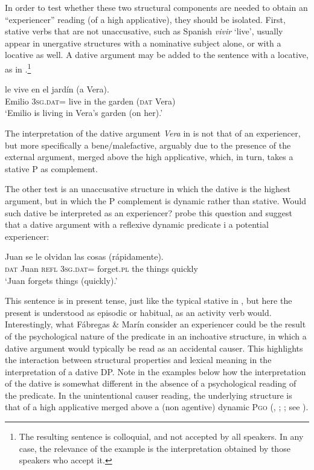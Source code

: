 \documentclass[output=paper,colorlinks,citecolor=brown,nonflat]{./langscibook}
\begin{document}
In order to test whether these two structural components are needed to obtain an “experiencer” reading (of a high applicative), they should be isolated. First, stative verbs that are not unaccusative, such as Spanish \textit{vivir} ‘live’, usually appear in unergative structures with a nominative subject alone, or with a locative as well. A dative argument may be added to the sentence with a locative, as in .\footnote{The resulting sentence is colloquial, and not accepted by all speakers. In any case, the relevance of the example is the interpretation obtained by those speakers who accept it.} 

\ea%
    \label{ex:cuervo:20}
     {le} {vive} {en} {el} {jardín} ({a} {Vera}).\\
    Emilio 3\textsc{sg.dat}= live in the garden (\textsc{dat}  Vera)\\
    \glt ‘Emilio is living in Vera’s garden (on her).’
    \z

The interpretation of the dative argument \textit{Vera} in  is not that of an experiencer, but more specifically a bene/malefactive, arguably due to the presence of the external argument, merged above the high applicative, which, in turn, takes a stative \liv P as complement. 

The other test is an unaccusative structure in which the dative is the highest argument, but in which the \liv P complement is dynamic rather than stative. Would such dative be interpreted as an experiencer?  probe this question and suggest that a dative argument with a reflexive dynamic predicate i a potential experiencer: 

\ea%
    \label{ex:cuervo:21}
     {Juan} {se} {le} {olvidan} {las} {cosas} {(rápidamente)}.\\
    \textsc{dat} Juan  \textsc{refl} 3\textsc{sg.dat}= forget.\textsc{pl} the things quickly\\
    \glt ‘Juan forgets things (quickly).'
    \z

This sentence is in present tense, just like the typical stative in , but here the present is understood as episodic or habitual, as an activity verb would. Interestingly, what Fábregas \& Marín consider an experiencer could be the result of the psychological nature of the predicate in an inchoative structure, in which a dative argument would typically be read as an accidental causer. This highlights the interaction between structural properties and lexical meaning in the interpretation of a dative DP. Note in the examples below how the interpretation of the dative is somewhat different in the absence of a psychological reading of the predicate. In the unintentional causer reading, the underlying structure is that of a high applicative merged above a (non agentive) dynamic \liv P\textsc{go} (\citealt{Cuervo2003}, \citeyear{Cuervo2014}; \citealt{Schäfer2008}; see ).
\end{document}
